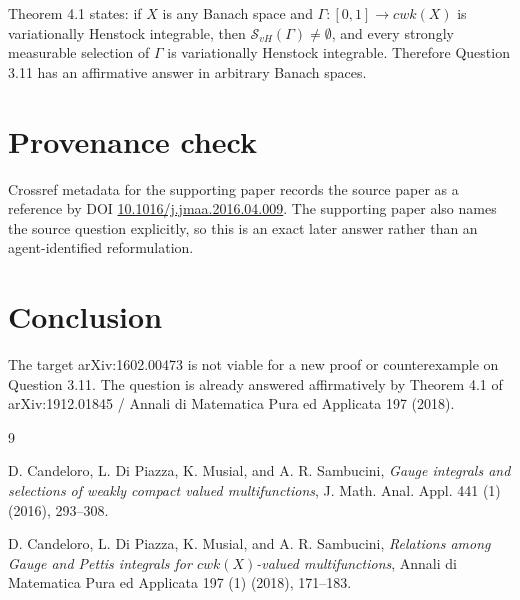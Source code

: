 \documentclass[11pt]{article}
\begin{document}
Theorem 4.1 states: if \(X\) is any Banach space and
\(\Gamma:[0,1]\to cwk(X)\) is variationally Henstock integrable, then
\(\mathcal S_{vH}(\Gamma)\neq\emptyset\), and every strongly measurable
selection of \(\Gamma\) is variationally Henstock integrable.  Therefore
Question 3.11 has an affirmative answer in arbitrary Banach spaces.

\section*{Provenance check}

Crossref metadata for the supporting paper records the source paper as a
reference by DOI
\href{https://doi.org/10.1016/j.jmaa.2016.04.009}{10.1016/j.jmaa.2016.04.009}.
The supporting paper also names the source question explicitly, so this is an
exact later answer rather than an agent-identified reformulation.

\section*{Conclusion}

The target arXiv:1602.00473 is not viable for a new proof or counterexample
on Question 3.11.  The question is already answered affirmatively by Theorem
4.1 of arXiv:1912.01845 / Annali di Matematica Pura ed Applicata 197 (2018).

\begin{thebibliography}{9}

D. Candeloro, L. Di Piazza, K. Musial, and A. R. Sambucini,
\emph{Gauge integrals and selections of weakly compact valued multifunctions},
J. Math. Anal. Appl. 441 (1) (2016), 293--308.

D. Candeloro, L. Di Piazza, K. Musial, and A. R. Sambucini,
\emph{Relations among Gauge and Pettis integrals for \(cwk(X)\)-valued
multifunctions},
Annali di Matematica Pura ed Applicata 197 (1) (2018), 171--183.

\end{thebibliography}
\end{document}
